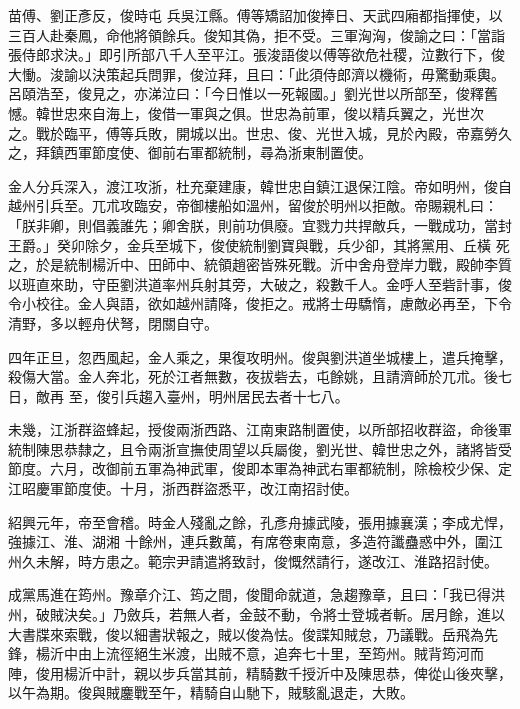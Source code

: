 \begin{pinyinscope}
 苗傅、劉正彥反，俊時屯
 兵吳江縣。傅等矯詔加俊捧日、天武四廂都指揮使，以三百人赴秦鳳，命他將領餘兵。俊知其偽，拒不受。三軍洶洶，俊諭之曰：「當詣張侍郎求決。」即引所部八千人至平江。張浚語俊以傅等欲危社稷，泣數行下，俊大慟。浚諭以決策起兵問罪，俊泣拜，且曰：「此須侍郎濟以機術，毋驚動乘輿。呂頤浩至，俊見之，亦涕泣曰：「今日惟以一死報國。」劉光世以所部至，俊釋舊憾。韓世忠來自海上，俊借一軍與之俱。世忠為前軍，俊以精兵翼之，光世次
 之。戰於臨平，傅等兵敗，開城以出。世忠、俊、光世入城，見於內殿，帝嘉勞久之，拜鎮西軍節度使、御前右軍都統制，尋為浙東制置使。



 金人分兵深入，渡江攻浙，杜充棄建康，韓世忠自鎮江退保江陰。帝如明州，俊自越州引兵至。兀朮攻臨安，帝御樓船如溫州，留俊於明州以拒敵。帝賜親札曰：「朕非卿，則倡義誰先；卿舍朕，則前功俱廢。宜戮力共捍敵兵，一戰成功，當封王爵。」癸卯除夕，金兵至城下，俊使統制劉寶與戰，兵少卻，其將黨用、丘橫
 死之，於是統制楊沂中、田師中、統領趙密皆殊死戰。沂中舍舟登岸力戰，殿帥李質以班直來助，守臣劉洪道率州兵射其旁，大破之，殺數千人。金呼人至砦計事，俊令小校往。金人與語，欲如越州請降，俊拒之。戒將士毋驕惰，慮敵必再至，下令清野，多以輕舟伏弩，閉關自守。



 四年正旦，忽西風起，金人乘之，果復攻明州。俊與劉洪道坐城樓上，遣兵掩擊，殺傷大當。金人奔北，死於江者無數，夜拔砦去，屯餘姚，且請濟師於兀朮。後七日，敵再
 至，俊引兵趨入臺州，明州居民去者十七八。



 未幾，江浙群盜蜂起，授俊兩浙西路、江南東路制置使，以所部招收群盜，命後軍統制陳思恭隸之，且令兩浙宣撫使周望以兵屬俊，劉光世、韓世忠之外，諸將皆受節度。六月，改御前五軍為神武軍，俊即本軍為神武右軍都統制，除檢校少保、定江昭慶軍節度使。十月，浙西群盜悉平，改江南招討使。



 紹興元年，帝至會稽。時金人殘亂之餘，孔彥舟據武陵，張用據襄漢；李成尤悍，強據江、淮、湖湘
 十餘州，連兵數萬，有席卷東南意，多造符讖蠱惑中外，圍江州久未解，時方患之。範宗尹請遣將致討，俊慨然請行，遂改江、淮路招討使。



 成黨馬進在筠州。豫章介江、筠之間，俊聞命就道，急趨豫章，且曰：「我已得洪州，破賊決矣。」乃斂兵，若無人者，金鼓不動，令將士登城者斬。居月餘，進以大書牒來索戰，俊以細書狀報之，賊以俊為怯。俊諜知賊怠，乃議戰。岳飛為先鋒，楊沂中由上流徑絕生米渡，出賊不意，追奔七十里，至筠州。賊背筠河而
 陣，俊用楊沂中計，親以步兵當其前，精騎數千授沂中及陳思恭，俾從山後夾擊，以午為期。俊與賊鏖戰至午，精騎自山馳下，賊駭亂退走，大敗。




\end{pinyinscope}
